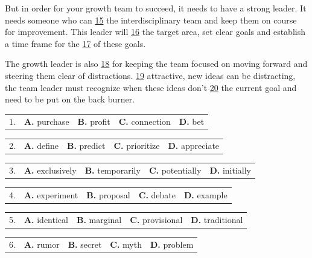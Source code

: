 \documentclass[UTF8,11pt]{ctexart}
\begin{document}
But in order for your growth team to succeed, it needs to have a strong leader. It needs someone who can \uline{15} the interdisciplinary team and keep them on course for improvement. This leader will \uline{16} the target area, set clear goals and establish a time frame for the \uline{17} of these goals.


The growth leader is also \uline{18} for keeping the team focused on moving forward and steering them clear of distractions. \uline{19} attractive, new ideas can be distracting, the team leader must recognize when these ideas don’t \uline{20} the current goal and need to be put on the back burner.


\noindent\begin{tabularx}{\linewidth}{@{}lXXXX@{}}1. & \textbf{A.} purchase & \textbf{B.} profit & \textbf{C.} connection & \textbf{D.} bet\\\end{tabularx}\par

\noindent\begin{tabularx}{\linewidth}{@{}lXXXX@{}}2. & \textbf{A.} define & \textbf{B.} predict & \textbf{C.} prioritize & \textbf{D.} appreciate\\\end{tabularx}\par

\noindent\begin{tabularx}{\linewidth}{@{}lXXXX@{}}3. & \textbf{A.} exclusively & \textbf{B.} temporarily & \textbf{C.} potentially & \textbf{D.} initially\\\end{tabularx}\par

\noindent\begin{tabularx}{\linewidth}{@{}lXXXX@{}}4. & \textbf{A.} experiment & \textbf{B.} proposal & \textbf{C.} debate & \textbf{D.} example\\\end{tabularx}\par

\noindent\begin{tabularx}{\linewidth}{@{}lXXXX@{}}5. & \textbf{A.} identical & \textbf{B.} marginal & \textbf{C.} provisional & \textbf{D.} traditional\\\end{tabularx}\par

\noindent\begin{tabularx}{\linewidth}{@{}lXXXX@{}}6. & \textbf{A.} rumor & \textbf{B.} secret & \textbf{C.} myth & \textbf{D.} problem\\\end{tabularx}\par
\end{document}
